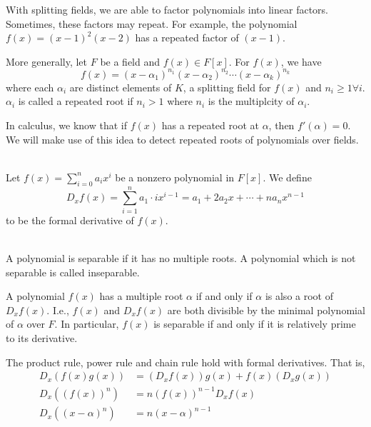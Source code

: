 With splitting fields, we are able to factor polynomials into linear factors. Sometimes, these factors may repeat. For example, the polynomial $f(x) = (x-1)^2(x-2)$ has a repeated factor of $(x-1)$.

More generally, let $F$ be a field and $f(x) \in F[x]$. For $f(x)$, we have
$$f(x) = (x-\alpha_1)^{n_1}(x-\alpha_2)^{n_2}\cdots(x-\alpha_k)^{n_k}$$
where each $\alpha_i$ are distinct elements of $K$, a splitting field for $f(x)$ and $n_i \geq 1 \forall i$. $\alpha_i$ is called a repeated root if $n_i > 1$ where $n_i$ is the multiplcity of $\alpha_i$.

In calculus, we know that if $f(x)$ has a repeated root at $\alpha$, then $f'(\alpha) = 0$. We will make use of this idea to detect repeated roots of polynomials over fields.

\begin{definition} \leavevmode \\
    Let $f(x) = \sum_{i=0}^n a_ix^i$ be a nonzero polynomial in $F[x]$. We define
    $$D_x f(x) = \sum_{i=1}^{n}a_{1}\cdot ix^{i-1} = a_1 + 2a_2x + \cdots + na_n x^{n-1}$$
    to be the formal derivative of $f(x)$.
\end{definition}

\begin{definition} \leavevmode \\
    A polynomial is separable if it has no multiple roots. A polynomial which is not separable is called inseparable.
\end{definition}

\begin{proposition}
    A polynomial $f(x)$ has a multiple root $\alpha$ if and only if $\alpha$ is also a root of $D_x f(x)$. I.e., $f(x)$ and $D_x f(x)$ are both divisible by the minimal polynomial of $\alpha$ over $F$. In particular, $f(x)$ is separable if and only if it is relatively prime to its derivative.
\end{proposition}

\begin{example}
    The product rule, power rule and chain rule hold with formal derivatives. That is,
    \begin{align*}
        D_x\left(f(x)g(x)\right)&= \left(D_xf(x)\right)g(x) + f(x)\left(D_x g(x)\right) \\ 
        D_x\left(\left(f(x)\right)^n\right) &= n\left(f(x)\right)^{n-1}D_x f(x) \\
        D_x \left((x-\alpha)^n\right) &= n (x-\alpha)^{n-1}
    \end{align*}
\end{example}

